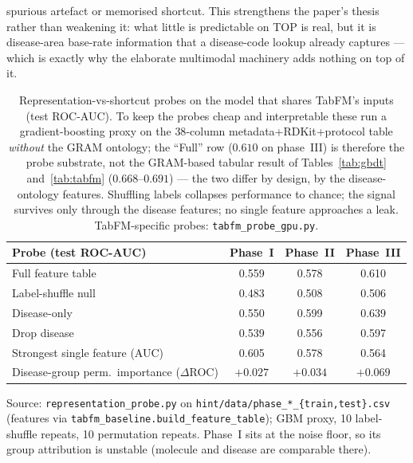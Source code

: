 \documentclass[a4paper,fleqn]{cas-sc}
\begin{document}
spurious artefact or memorised shortcut. This strengthens the paper's thesis rather than
weakening it: what little is predictable on TOP is real, but it is disease-area base-rate
information that a disease-code lookup already captures --- which is exactly why the elaborate
multimodal machinery adds nothing on top of it.
\begin{table}[t]
\centering\small
\caption{Representation-vs-shortcut probes on the model that shares TabFM's inputs (test
ROC-AUC). To keep the probes cheap and interpretable these run a gradient-boosting proxy on the
$38$-column metadata+RDKit+protocol table \emph{without} the GRAM ontology; the ``Full''
row ($0.610$ on phase~III) is therefore the probe substrate, not the GRAM-based tabular result
of Tables~\ref{tab:gbdt} and~\ref{tab:tabfm} ($0.668$--$0.691$) --- the two differ by design,
by the disease-ontology features. Shuffling labels collapses performance to chance; the signal
survives only through the disease features; no single feature approaches a leak. TabFM-specific
probes: \texttt{tabfm\_probe\_gpu.py}.}
\label{tab:probe}
\begin{tabular}{lccc}
\toprule
Probe (test ROC-AUC) & Phase~I & Phase~II & Phase~III \\
\midrule
Full feature table            & 0.559 & 0.578 & 0.610 \\
Label-shuffle null            & 0.483 & 0.508 & 0.506 \\
Disease-only                  & 0.550 & 0.599 & 0.639 \\
Drop disease                  & 0.539 & 0.556 & 0.597 \\
Strongest single feature (AUC)& 0.605 & 0.578 & 0.564 \\
Disease-group perm.\ importance ($\Delta$ROC) & $+0.027$ & $+0.034$ & $+0.069$ \\
\bottomrule
\end{tabular}
\begin{minipage}{\linewidth}\vspace{2pt}\scriptsize Source: \texttt{representation\_probe.py} on \texttt{hint/data/phase\_*\_\{train,test\}.csv} (features via \texttt{tabfm\_baseline.build\_feature\_table}); GBM proxy, 10 label-shuffle repeats, 10 permutation repeats. Phase~I sits at the noise floor, so its group attribution is unstable (molecule and disease are comparable there). \end{minipage}
\end{table}
\end{document}

